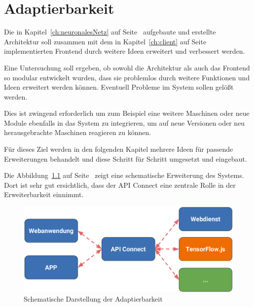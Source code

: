 \chapter{Adaptierbarkeit}
\label{ch:adaptierbarkeit}
Die in Kapitel~\ref{ch:neuronalesNetz} auf Seite~\pageref{ch:neuronalesNetz} aufgebaute und erstellte Architektur soll
zusammen mit dem in Kapitel~\ref{ch:client} auf Seite~\pageref{ch:client} implementierten Frontend durch weitere Ideen
erweitert und verbessert werden.

Eine Untersuchung soll ergeben, ob sowohl die Architektur als auch das Frontend so modular entwickelt wurden, dass sie 
problemlos durch weitere Funktionen und Ideen erweitert werden können. Eventuell Probleme im System sollen gelößt
werden.

Dies ist zwingend erforderlich um zum Beispiel eine weitere Maschinen oder neue Module ebenfalls in das System zu 
integrieren, um auf neue Versionen oder neu herausgebrachte Maschinen reagieren zu können.

Für dieses Ziel werden in den folgenden Kapitel mehrere Ideen für passende Erweiterungen behandelt und diese Schritt für 
Schritt umgesetzt und eingebaut.

Die Abbildung~\ref{fig:schematische_architektur_5} auf Seite~\pageref{fig:schematische_architektur_5} zeigt eine
schematische Erweiterung des Systems. Dort ist sehr gut ersichtlich, dass der API Connect eine zentrale Rolle in der
Erweiterbarkeit einnimmt.

\begin{figure}[h]
    \centering
    \includegraphics[width=\textwidth]{images/kapitel_5/architektur_schematisch.pdf}
    \caption{Schematische Darstellung der Adaptierbarkeit}
    \label{fig:schematische_architektur_5}
\end{figure}